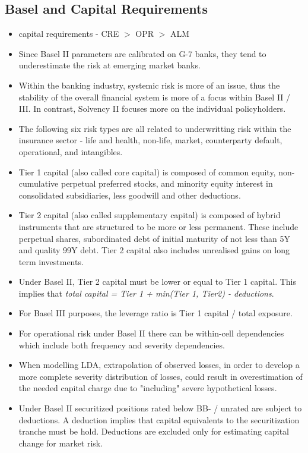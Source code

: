 \subsection{Basel and Capital Requirements}
\begin{itemize}
	\item capital requirements - CRE $>$ OPR $>$ ALM
	\item Since Basel II parameters are calibrated on G-7 banks, they tend to underestimate the risk at emerging market banks.
	\item Within the banking industry, systemic risk is more of an issue, thus the stability of the overall financial system is more of a focus within Basel II / III. In contrast, Solvency II focuses more on the individual policyholders.
	\item The following six risk types are all related to underwritting risk within the insurance sector - life and health, non-life, market, counterparty default, operational, and intangibles.
	\item Tier 1 capital (also called core capital) is composed of common equity, non-cumulative perpetual preferred stocks, and minority equity interest in consolidated subsidiaries, less goodwill and other deductions.
	\item Tier 2 capital (also called supplementary capital) is composed of hybrid instruments that are structured to be more or less permanent. These include perpetual shares, subordinated debt of initial maturity of not less than 5Y and quality 99Y debt. Tier 2 capital also includes unrealised gains on long term investments.
	\item Under Basel II, Tier 2 capital must be lower or equal to Tier 1 capital. This implies that \textit{total 
	capital = Tier 1 + min(Tier 1, Tier2) - deductions}.
	\item For Basel III purposes, the leverage ratio is Tier 1 capital / total exposure.
	\item For operational risk under Basel II there can be within-cell dependencies which include both frequency and severity dependencies.
	\item When modelling LDA, extrapolation of observed losses, in order to develop a more complete severity distribution of losses, could result in overestimation of the needed capital charge due to "including" severe hypothetical losses.
	\item Under Basel II securitized positions rated below BB- / unrated are subject to deductions. A deduction implies that capital equivalents to the securitization tranche must be hold. Deductions are excluded only for estimating capital change for market risk.

\end{itemize}
